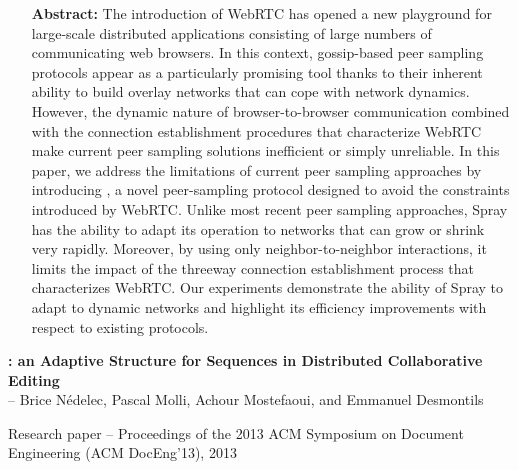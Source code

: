 \begin{itemize}
\item [\textbf{Abstract:}] {\small The introduction of WebRTC has opened a new
    playground for large-scale distributed applications consisting of large
    numbers of communicating web browsers. In this context, gossip-based peer
    sampling protocols appear as a particularly promising tool thanks to their
    inherent ability to build overlay networks that can cope with network
    dynamics. However, the dynamic nature of browser-to-browser communication
    combined with the connection establishment procedures that characterize
    WebRTC make current peer sampling solutions inefficient or simply
    unreliable. In this paper, we address the limitations of current peer
    sampling approaches by introducing \SPRAY, a novel peer-sampling protocol
    designed to avoid the constraints introduced by WebRTC. Unlike most recent
    peer sampling approaches, Spray has the ability to adapt its operation to
    networks that can grow or shrink very rapidly. Moreover, by using only
    neighbor-to-neighbor interactions, it limits the impact of the threeway
    connection establishment process that characterizes WebRTC. Our experiments
    demonstrate the ability of Spray to adapt to dynamic networks and highlight
    its efficiency improvements with respect to existing protocols.}
\end{itemize}



\noindent \textbf{\LSEQ: an Adaptive Structure for Sequences in Distributed
  Collaborative Editing}\\
\indent -- Brice Nédelec, Pascal Molli, Achour Mostefaoui, and Emmanuel
Desmontils

\noindent Research paper -- Proceedings of the 2013 ACM Symposium on Document
Engineering (ACM DocEng'13), 2013

